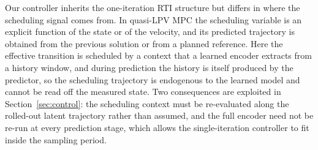 Our controller inherits the one-iteration RTI structure but differs in where the scheduling signal comes from. In quasi-LPV MPC the scheduling variable is an explicit function of the state or of the velocity, and its predicted trajectory is obtained from the previous solution or from a planned reference. Here the effective transition is scheduled by a context that a learned encoder extracts from a history window, and during prediction the history is itself produced by the predictor, so the scheduling trajectory is endogenous to the learned model and cannot be read off the measured state. Two consequences are exploited in Section~\ref{sec:control}: the scheduling context must be re-evaluated along the rolled-out latent trajectory rather than assumed, and the full encoder need not be re-run at every prediction stage, which allows the single-iteration controller to fit inside the sampling period.

